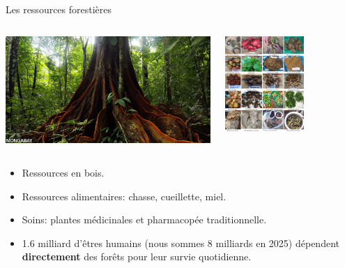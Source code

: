 \documentclass[10pt,table,dvipsnames,compress]{beamer}
\begin{document}
\begin{frame}[label={sec:orga346c2b}]{Les ressources forestières}
\begin{columns}
\begin{column}{0.5\columnwidth}
\begin{center}
\includegraphics[width=\textwidth]{figs/costa_rica_osa_0077_1280x670.jpg}
\end{center}
\end{column}
\begin{column}{0.5\columnwidth}
\begin{center}
\includegraphics[width=0.6\textwidth]{figs/cueillette.jpg}
\end{center}
\end{column}
\end{columns}
\begin{itemize}
\item Ressources en bois.
\item Ressources alimentaires: chasse, cueillette, miel.
\item Soins: plantes médicinales et pharmacopée traditionnelle.
\item 1.6 milliard d'êtres humains (nous sommes 8 milliards en 2025) dépendent \textbf{directement} des forêts pour leur survie quotidienne.
\end{itemize}
\end{frame}
\end{document}
